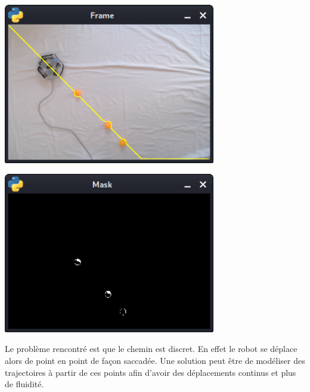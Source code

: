 \begin{center}
    \includegraphics[height=7cm]{path.png}
\end{center}

\begin{center}
    \includegraphics[height=7cm]{noir.png}
\end{center}

Le problème rencontré est que le chemin est discret. En effet le robot se déplace alors de point en point de façon saccadée. 
Une solution peut être de modéliser des trajectoires à partir de ces points afin d’avoir des déplacements continus et plus de fluidité.

